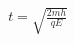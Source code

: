 \documentclass[preview]{standalone}
\begin{document}
\begin{align*}
t = \sqrt{\frac{2mh}{qE}}
\end{align*}
\end{document}
